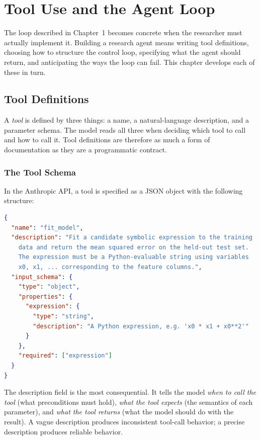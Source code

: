 \chapter{Tool Use and the Agent Loop}
\label{chapter:AgentLoop}

The loop described in Chapter~1 becomes concrete when the researcher must actually implement it.
Building a research agent means writing tool definitions, choosing how to structure the control loop, specifying what the agent should return, and anticipating the ways the loop can fail.
This chapter develops each of these in turn.

\section{Tool Definitions}
\label{section:ToolDefinitions}

A \emph{tool} is defined by three things: a name, a natural-language description, and a parameter schema.
The model reads all three when deciding which tool to call and how to call it.
Tool definitions are therefore as much a form of documentation as they are a programmatic contract.

\subsection{The Tool Schema}

In the Anthropic API, a tool is specified as a JSON object with the following structure:

\begin{lstlisting}[language=json]
{
  "name": "fit_model",
  "description": "Fit a candidate symbolic expression to the training
    data and return the mean squared error on the held-out test set.
    The expression must be a Python-evaluable string using variables
    x0, x1, ... corresponding to the feature columns.",
  "input_schema": {
    "type": "object",
    "properties": {
      "expression": {
        "type": "string",
        "description": "A Python expression, e.g. 'x0 * x1 + x0**2'"
      }
    },
    "required": ["expression"]
  }
}
\end{lstlisting}

The description field is the most consequential.
It tells the model \emph{when to call the tool} (what preconditions must hold), \emph{what the tool expects} (the semantics of each parameter), and \emph{what the tool returns} (what the model should do with the result).
A vague description produces inconsistent tool-call behavior; a precise description produces reliable behavior.


